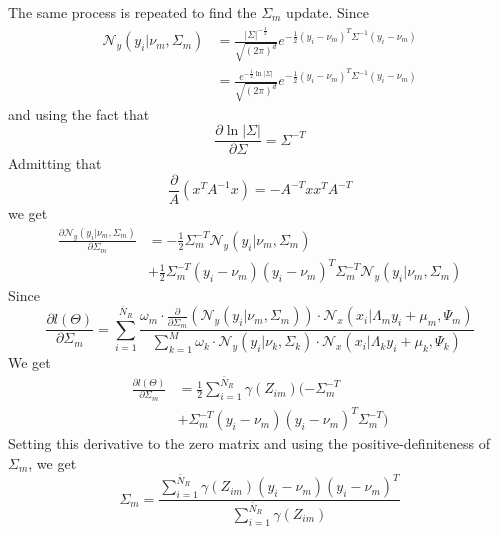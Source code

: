 The same process is repeated to find the $\Sigma_m$ update. Since
\begin{align}
\mathcal{N}_y\left(y_i\vert\nu_m,\Sigma_m\right) &= \frac{\vert\Sigma\vert^{-\frac{1}{2}}}{\sqrt{\left(2\pi\right)^d}}e^{-\frac{1}{2}\left(y_i - \nu_m\right)^T\Sigma^{-1}\left(y_i - \nu_m\right)}\\
&= \frac{e^{-\frac{1}{2}\ln\vert\Sigma\vert}}{\sqrt{\left(2\pi\right)^d}}e^{-\frac{1}{2}\left(y_i - \nu_m\right)^T\Sigma^{-1}\left(y_i - \nu_m\right)}
\end{align}
and using the fact that
\begin{equation}
\frac{\partial \ln\vert\Sigma\vert}{\partial \Sigma} = \Sigma^{-T}
\end{equation}
Admitting that
\begin{equation}
\frac{\partial }{A}\left(x^TA^{-1}x\right) = - A^{-T}xx^TA^{-T}
\end{equation}
we get
\begin{align}
\frac{\partial\mathcal{N}_y\left(y_i\vert\nu_m,\Sigma_m\right)}{\partial \Sigma_m} &= -\frac{1}{2}\Sigma_m^{-T}\mathcal{N}_y\left(y_i\vert\nu_m,\Sigma_m\right) \nonumber\\
&+ \frac{1}{2}
\Sigma_m^{-T}\left(y_i - \nu_m\right)\left(y_i - \nu_m\right)^T\Sigma_m^{-T}\mathcal{N}_y\left(y_i\vert\nu_m,\Sigma_m\right) 
\end{align}
Since
\begin{equation}
\frac{\partial l(\Theta)}{\partial \Sigma_m} =   \sum\limits_{i = 1}^{\bar{N}_R}
\frac{\omega_m\cdot
\frac{\partial }{\partial \Sigma_m}\left(\mathcal{N}_y\left(y_i\vert\nu_m,\Sigma_m\right)\right)\cdot\mathcal{N}_x\left(x_i\vert\Lambda_my_i + \mu_m,\Psi_m\right)}{\sum\limits_{k = 1}^{M}\omega_k\cdot
\mathcal{N}_y\left(y_i\vert\nu_k,\Sigma_k\right)\cdot\mathcal{N}_x\left(x_i\vert\Lambda_ky_i + \mu_k,\Psi_k\right) }
\end{equation}
We get
\begin{align}
\frac{\partial l(\Theta)}{\partial \Sigma_m} &=  \frac{1}{2} \sum\limits_{i = 1}^{\bar{N}_R}\gamma\left(Z_{im}\right)(-\Sigma_m^{-T}\nonumber\\
&+ 
\Sigma_m^{-T}\left(y_i - \nu_m\right)\left(y_i - \nu_m\right)^T\Sigma_m^{-T} )
\end{align}
Setting this derivative to the zero matrix and using the positive-definiteness of $\Sigma_m$, we get
\begin{equation}
\boxed{
\Sigma_m = \frac{  \sum\limits_{i = 1}^{\bar{N}_R} \gamma(Z_{im})\left(y_i - \nu_m\right)\left(y_i - \nu_m\right)^T }{  \sum\limits_{i = 1}^{\bar{N}_R}\gamma(Z_{im})}}
\end{equation}
